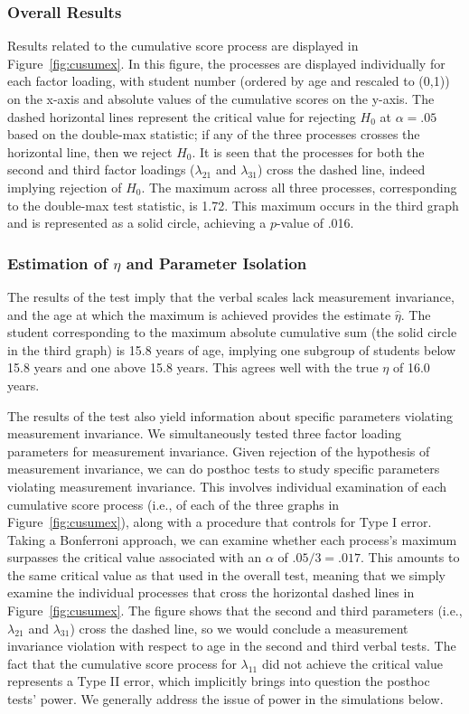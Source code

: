 \documentclass[man]{apa}
\begin{document}
\subsubsection{Overall Results}
Results related to the cumulative score process are displayed in
Figure~\ref{fig:cusumex}.  In this figure, the processes
are displayed individually 
for each factor loading, with student number (ordered by age and
rescaled to (0,1)) on the x-axis and
absolute values of the cumulative scores on the y-axis.  The dashed horizontal
lines represent the critical value for rejecting $H_0$ at $\alpha=.05$
based on the double-max statistic; if any of the three processes
crosses the horizontal line, then we reject $H_0$.  It is seen that
the processes for both the second and third factor loadings
($\lambda_{21}$ and $\lambda_{31}$) cross the dashed line, indeed
implying rejection of $H_0$.  The maximum across all three processes,
corresponding to the double-max test statistic, is 1.72.  This maximum
occurs in the third graph and is represented as a solid circle, 
achieving a $p$-value of .016.  



\subsubsection{Estimation of $\eta$ and Parameter Isolation}
The results of the test imply that the 
verbal scales lack measurement invariance, and the age at which the
maximum is achieved provides the estimate $\hat{\eta}$.
The student corresponding to the maximum
absolute cumulative sum (the solid circle in the third graph) is 15.8
years of age, implying one subgroup of 
students below 15.8 years and one above 15.8 years.  This agrees well
with the true $\eta$ of 16.0 years.

The results of the test also yield information about specific
parameters violating measurement invariance.  We simultaneously tested
three factor loading parameters for measurement invariance.  Given
rejection of the hypothesis of measurement invariance, we can 
do posthoc 
tests to study specific parameters violating measurement invariance.
This involves individual examination of each cumulative score process
(i.e., of each of the three graphs in Figure~\ref{fig:cusumex}),
along with a procedure that controls for Type I error.  Taking a
Bonferroni approach, we can examine whether each process's maximum
surpasses the critical value associated with an $\alpha$ of
$.05/3=.017$.  This amounts to the same critical value as that used in
the overall test, 
meaning that we simply examine the individual processes that cross
the horizontal dashed lines in Figure~\ref{fig:cusumex}.  The figure
shows that the second and third parameters (i.e., $\lambda_{21}$ and
$\lambda_{31}$) cross the dashed line, so we would conclude a measurement
invariance violation with respect to age in the second and third
verbal tests.  The fact that the cumulative score process for
$\lambda_{11}$ did not achieve the critical value represents a Type II
error, which implicitly brings into question the posthoc tests' power.  We
generally address the issue of power in the simulations below.
\end{document}

